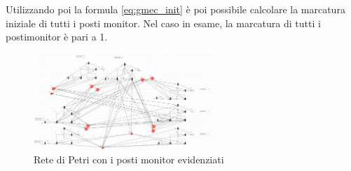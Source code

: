 Utilizzando poi la formula \ref{eq:gmec_init} è poi possibile calcolare la marcatura iniziale di tutti i posti monitor. Nel caso in esame, la marcatura di tutti i postimonitor è pari a 1.

\begin{figure}[H]
    \centering
    \includegraphics[width=0.6\textwidth]{figure/project_screenshots/sem_fin_controlli_evidenziati.jpg}
    \caption{Rete di Petri con i posti monitor evidenziati}
    \label{fig:petri_supervisori}
\end{figure}